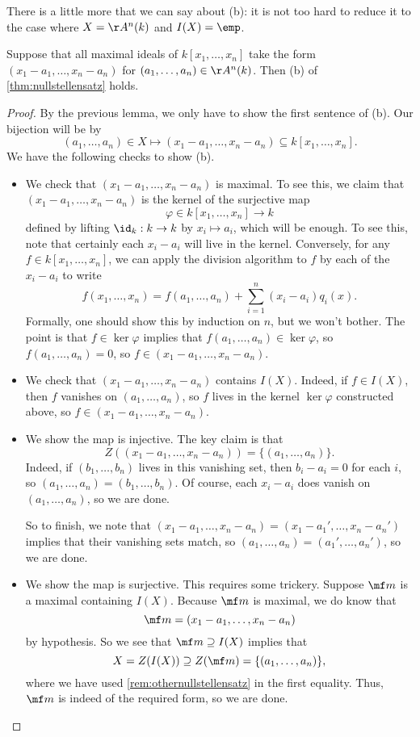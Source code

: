 There is a little more that we can say about (b): it is not too hard to reduce it to the case where $X=\AA^n(k)$ and $I(X)=\emp$.
\begin{lemma} \label{lem:nzeasierb}
	Suppose that all maximal ideals of $k[x_1,\ldots,x_n]$ take the form $(x_1-a_1,\ldots,x_n-a_n)$ for $(a_1,\ldots,a_n)\in\AA^n(k)$. Then (b) of \autoref{thm:nullstellensatz} holds.
\end{lemma}
\begin{proof}
	By the previous lemma, we only have to show the first sentence of (b). Our bijection will be by
	\[(a_1,\ldots,a_n)\in X\longmapsto(x_1-a_1,\ldots,x_n-a_n)\subseteq k[x_1,\ldots,x_n].\]
	We have the following checks to show (b).
	\begin{itemize}
		\item We check that $(x_1-a_1,\ldots,x_n-a_n)$ is maximal. To see this, we claim that $(x_1-a_1,\ldots,x_n-a_n)$ is the kernel of the surjective map
		\[\varphi\in k[x_1,\ldots,x_n]\to k\]
		defined by lifting $\id_k:k\to k$ by $x_i\mapsto a_i$, which will be enough. To see this, note that certainly each $x_i-a_i$ will live in the kernel. Conversely, for any $f\in k[x_1,\ldots,x_n]$, we can apply the division algorithm to $f$ by each of the $x_i-a_i$ to write
		\[f(x_1,\ldots,x_n)=f(a_1,\ldots,a_n)+\sum_{i=1}^n(x_i-a_i)q_i(x).\]
		Formally, one should show this by induction on $n$, but we won't bother. The point is that $f\in\ker\varphi$ implies that $f(a_1,\ldots,a_n)\in\ker\varphi$, so $f(a_1,\ldots,a_n)=0$, so $f\in(x_1-a_1,\ldots,x_n-a_n)$.
		\item We check that $(x_1-a_1,\ldots,x_n-a_n)$ contains $I(X)$. Indeed, if $f\in I(X)$, then $f$ vanishes on $(a_1,\ldots,a_n)$, so $f$ lives in the kernel $\ker\varphi$ constructed above, so $f\in(x_1-a_1,\ldots,x_n-a_n)$.
		\item We show the map is injective. The key claim is that
		\[Z((x_1-a_1,\ldots,x_n-a_n))=\{(a_1,\ldots,a_n)\}.\]
		Indeed, if $(b_1,\ldots,b_n)$ lives in this vanishing set, then $b_i-a_i=0$ for each $i$, so $(a_1,\ldots,a_n)=(b_1,\ldots,b_n)$. Of course, each $x_i-a_i$ does vanish on $(a_1,\ldots,a_n)$, so we are done.

		So to finish, we note that $(x_1-a_1,\ldots,x_n-a_n)=(x_1-a_1',\ldots,x_n-a_n')$ implies that their vanishing sets match, so $(a_1,\ldots,a_n)=(a_1',\ldots,a_n')$, so we are done.
		\item We show the map is surjective. This requires some trickery. Suppose $\mf m$ is a maximal containing $I(X)$. Because $\mf m$ is maximal, we do know that
		\[\mf m=(x_1-a_1,\ldots,x_n-a_n)\]
		by hypothesis. So we see that $\mf m\supseteq I(X)$ implies that
		\[X=Z(I(X))\supseteq Z(\mf m)=\{(a_1,\ldots,a_n)\},\]
		where we have used \autoref{rem:othernullstellensatz} in the first equality. Thus, $\mf m$ is indeed of the required form, so we are done.
		\qedhere
	\end{itemize}
\end{proof}

